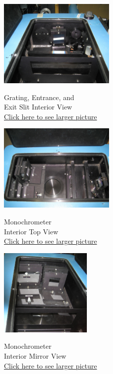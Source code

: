 \documentclass{../lab}
\begin{document}
\begin{figure}[H]
\captionsetup{justification=centering}
  \href{http://experimentationlab.berkeley.edu/sites/default/files/images/ATM-mono-Grating_3500-Lg.jpg}{\includegraphics[height=120pt,keepaspectratio]{images/ATM-mono-Grating_3500-Lg.jpg}}
  \caption{Grating, Entrance, and \\ Exit Slit Interior View \\ \href{http://experimentationlab.berkeley.edu/sites/default/files/images/ATM-mono-Grating_3500-Lg.jpg}{Click here to see larger picture}}
  \label{fig:MonochrometerInteriorSide}
\endminipage\hfill
{}
  \href{http://experimentationlab.berkeley.edu/sites/default/files/images/ATM-mono-In-Topview_3501-Lg.jpg}{\includegraphics[height=120pt,keepaspectratio]{images/ATM-mono-In-Topview_3501-Lg.jpg}}
  \caption{Monochrometer \\ Interior Top View\\ \href{http://experimentationlab.berkeley.edu/sites/default/files/images/ATM-mono-In-Topview_3501-Lg.jpg}{Click here to see larger picture}}\label{fig:MonochrometerInteriorTop}
\endminipage \hfill
{}
  \href{http://experimentationlab.berkeley.edu/sites/default/files/images/ATM-mono-In-Mirrors_3499-Lg.jpg}{\includegraphics[height=120pt,keepaspectratio]{images/ATM-mono-In-Mirrors_3499-Lg.jpg}}
  \caption{Monochrometer \\ Interior Mirror View \\ \href{http://experimentationlab.berkeley.edu/sites/default/files/images/ATM-mono-In-Mirrors_3499-Lg.jpg}{Click here to see larger picture}}\label{fig:Multiplet}
\endminipage
\end{figure}
\end{document}

